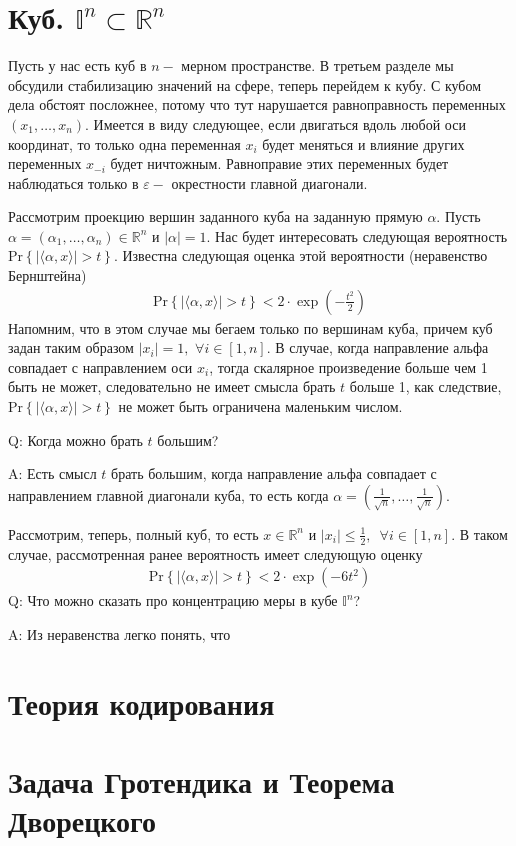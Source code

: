 \documentclass[12pt]{article}
\begin{document}
\section{Куб. $\mathbb{I}^n \subset \mathbb{R}^n$}
\par Пусть у нас есть куб в $n-$ мерном пространстве. В третьем разделе мы обсудили стабилизацию значений на сфере, теперь перейдем к кубу. С кубом дела обстоят посложнее, потому что тут нарушается равноправность переменных $(x_1, \dots, x_n)$. Имеется в виду следующее, если двигаться вдоль любой оси координат, то только одна переменная $x_i$ будет меняться и влияние других переменных $x_{-i}$ будет ничтожным. Равноправие этих переменных будет наблюдаться только в $\varepsilon-$ окрестности главной диагонали. 
\par Рассмотрим проекцию вершин заданного куба на заданную прямую $\alpha$. Пусть $\alpha = (\alpha_1, \dots, \alpha_n) \in \mathbb{R}^n$ и $|\alpha| = 1$. Нас будет интересовать следующая вероятность $\text{Pr}\left\{| \langle \alpha, x \rangle | > t\right\}$. Известна следующая оценка этой вероятности (неравенство Бернштейна)
\begin{eqnarray}
\text{Pr}\left\{| \langle \alpha, x \rangle | > t\right\} < 2 \cdot \exp\left(-\frac {t^2} 2\right)
\end{eqnarray}
Напомним, что в этом случае мы бегаем только по вершинам куба, причем куб задан таким образом $|x_i| = 1, \,\, \forall i \in [1,n]$. В случае, когда направление альфа совпадает с направлением оси $x_i$, тогда скалярное произведение больше чем 1 быть не может, следовательно не имеет смысла брать $t$ больше 1, как следствие, $\text{Pr}\left\{| \langle \alpha, x \rangle | > t\right\}$ не может быть ограничена маленьким числом. 
\par Q: Когда можно брать $t$ большим? 
\par A: Есть смысл $t$ брать большим, когда направление альфа совпадает с направлением главной диагонали куба, то есть когда $\alpha = \left(\frac 1 {\sqrt{n}}, \dots, \frac 1 {\sqrt{n}}\right)$. 
\par Рассмотрим, теперь, полный куб, то есть $x \in \mathbb{R}^n$ и $|x_i| \le \frac 1 2, \,\,\, \forall i \in [1, n]$. В таком случае, рассмотренная ранее вероятность имеет следующую оценку 
\begin{eqnarray}
\text{Pr}\left\{| \langle \alpha, x \rangle | > t\right\} < 2 \cdot \exp\left(-6{t^2}\right)
\end{eqnarray}
Q: Что можно сказать про концентрацию меры в кубе $\mathbb{I}^n$?
\par A: Из неравенства легко понять, что 
\section{Теория кодирования}
\section{Задача Гротендика и Теорема Дворецкого}
\end{document}
